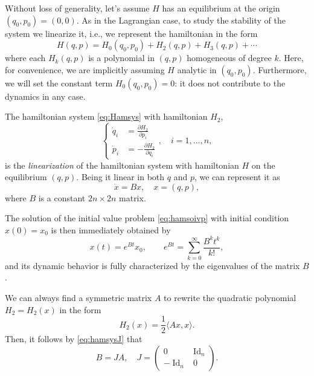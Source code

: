 \documentclass[english,fontsize=11pt,paper=b5]{scrbook}
\DeclareMathOperator{\Id}{Id}
\DeclareMathOperator{\Id}{Id}
\theoremstyle{definition}
\begin{document}
      Without loss of generality, let's assume $H$ has an equilibrium at the origin $(q_0, p_0) = (0,0)$.
      As in the Lagrangian case, to study the stability of the system we linearize it, i.e., we represent the hamiltonian in the form
      \begin{equation}\label{eq:hamidevl}
        H(q,p) = H_0(q_0,p_0) + H_2(q,p) + H_3(q,p) + \cdots
      \end{equation}
      where each $H_k(q,p)$ is a polynomial in $(q,p)$ homogeneous of degree $k$.
      Here, for convenience, we are implicitly assuming $H$ analytic in $(q_0,p_0)$.
      Furthermore, we will set the constant term $H_0(q_0,p_0) = 0$: it does not contribute to the dynamics in any case.

      The hamiltonian system \eqref{eq:Hamsys} with hamiltonian $H_2$,
      \begin{equation}\label{eq:lienarizedH}
        \left\lbrace
          \begin{aligned}
            \dot q_i &= \frac{\partial H_2}{\partial p_i} \\
            \dot p_i &= -\frac{\partial H_2}{\partial q_i}
          \end{aligned}
        \right .,\quad i=1,\ldots,n,
      \end{equation}
      is the \emph{linearization} of the hamiltonian system with hamiltonian $H$ on the equilibrium $(q,p)$.
      Being it linear in both $q$ and $p$, we can represent it as
      \begin{equation}\label{eq:hamsoivp}
        \dot x = B x,\quad x =(q,p),
      \end{equation}
      where $B$ is a constant $2n\times2n$ matrix.

      The solution of the initial value problem \eqref{eq:hamsoivp} with initial condition $x(0) = x_0$ is then immediately obtained by
      \begin{equation}
        x(t) = e^{Bt} x_0, \qquad e^{Bt} = \sum_{k=0}^\infty \frac{B^k t^k}{k!},
      \end{equation}
      and its dynamic behavior is fully characterized by the eigenvalues of the matrix $B$.

      We can always find a symmetric matrix $A$ to rewrite the quadratic polynomial $H_2 = H_2(x)$ in the form
      \begin{equation}
        H_2(x) = \frac12 \langle Ax, x\rangle.
      \end{equation}
      Then, it follows by \eqref{eq:hamsysJ} that
      \begin{equation}
        B = J A, \quad J = \begin{pmatrix}
          0 & \Id_n \\-\Id_n&0
        \end{pmatrix}.
      \end{equation}
\end{document}
